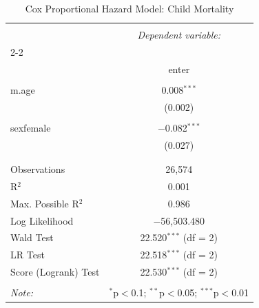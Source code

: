 
\begin{table}[!htbp] \centering 
  \caption{Cox Proportional Hazard Model: Child Mortality} 
  \label{} 
\begin{tabular}{@{\extracolsep{5pt}}lc} 
\\[-1.8ex]\hline 
\hline \\[-1.8ex] 
 & \multicolumn{1}{c}{\textit{Dependent variable:}} \\ 
\cline{2-2} 
\\[-1.8ex] & enter \\ 
\hline \\[-1.8ex] 
 m.age & 0.008$^{***}$ \\ 
  & (0.002) \\ 
  & \\ 
 sexfemale & $-$0.082$^{***}$ \\ 
  & (0.027) \\ 
  & \\ 
\hline \\[-1.8ex] 
Observations & 26,574 \\ 
R$^{2}$ & 0.001 \\ 
Max. Possible R$^{2}$ & 0.986 \\ 
Log Likelihood & $-$56,503.480 \\ 
Wald Test & 22.520$^{***}$ (df = 2) \\ 
LR Test & 22.518$^{***}$ (df = 2) \\ 
Score (Logrank) Test & 22.530$^{***}$ (df = 2) \\ 
\hline 
\hline \\[-1.8ex] 
\textit{Note:}  & \multicolumn{1}{r}{$^{*}$p$<$0.1; $^{**}$p$<$0.05; $^{***}$p$<$0.01} \\ 
\end{tabular} 
\end{table}  
